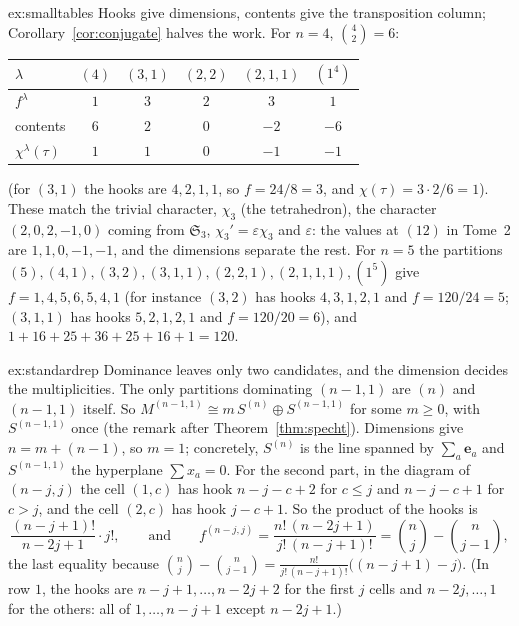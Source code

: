 \begin{solution}{ex:smalltables}
\idea Hooks give dimensions, contents give the transposition column; Corollary~\ref{cor:conjugate} halves the work.
\writeup For $n=4$, $\binom42=6$:
\begin{center}
\begin{tabular}{@{}l@{\enspace}c@{\enspace}c@{\enspace}c@{\enspace}c@{\enspace}c@{}}
$\lambda$ & $(4)$ & $(3,1)$ & $(2,2)$ & $(2,1,1)$ & $(1^4)$\\\hline
$f^\lambda$ & $1$ & $3$ & $2$ & $3$ & $1$\\
contents & $6$ & $2$ & $0$ & $-2$ & $-6$\\
$\chi^\lambda(\tau)$ & $1$ & $1$ & $0$ & $-1$ & $-1$
\end{tabular}
\end{center}
(for $(3,1)$ the hooks are $4,2,1,1$, so $f=24/8=3$, and $\chi(\tau)=3\cdot2/6=1$). These match the trivial character, $\chi_3$ (the tetrahedron), the character $(2,0,2,-1,0)$ coming from $\mathfrak S_3$, $\chi_3'=\varepsilon\chi_3$ and $\varepsilon$:
the values at $(12)$ in Tome~2 are $1,1,0,-1,-1$, and the dimensions separate the rest. For $n=5$ the partitions $(5),(4,1),(3,2),(3,1,1),(2,2,1),(2,1,1,1),(1^5)$ give $f=1,4,5,6,5,4,1$ (for instance $(3,2)$ has hooks $4,3,1,2,1$ and $f=120/24=5$; $(3,1,1)$ has hooks $5,2,1,2,1$ and
$f=120/20=6$), and $1+16+25+36+25+16+1=120$.
\end{solution}

\begin{solution}{ex:standardrep}
\idea Dominance leaves only two candidates, and the dimension decides the multiplicities.
\writeup The only partitions dominating $(n-1,1)$ are $(n)$ and $(n-1,1)$ itself. So $M^{(n-1,1)}\cong m\,S^{(n)}\oplus S^{(n-1,1)}$ for some $m\ge0$, with $S^{(n-1,1)}$ once (the remark after Theorem~\ref{thm:specht}). Dimensions give $n=m+(n-1)$, so $m=1$;
concretely, $S^{(n)}$ is the line spanned by $\sum_a\mathbf e_a$ and $S^{(n-1,1)}$ the hyperplane $\sum x_a=0$. For the second part, in the diagram of $(n-j,j)$ the cell $(1,c)$ has hook $n-j-c+2$ for $c\le j$ and $n-j-c+1$ for $c>j$, and the cell $(2,c)$ has hook $j-c+1$.
So the product of the hooks is
\[
\frac{(n-j+1)!}{n-2j+1}\cdot j!,\qquad\text{and}\qquad f^{(n-j,j)}=\frac{n!\,(n-2j+1)}{j!\,(n-j+1)!}=\binom nj-\binom n{j-1},
\]
the last equality because $\binom nj-\binom n{j-1}=\frac{n!}{j!\,(n-j+1)!}\bigl((n-j+1)-j\bigr)$. (In row $1$, the hooks are $n-j+1,\dots,n-2j+2$ for the first $j$ cells and $n-2j,\dots,1$ for the others: all of $1,\dots,n-j+1$ except $n-2j+1$.)
\end{solution}

